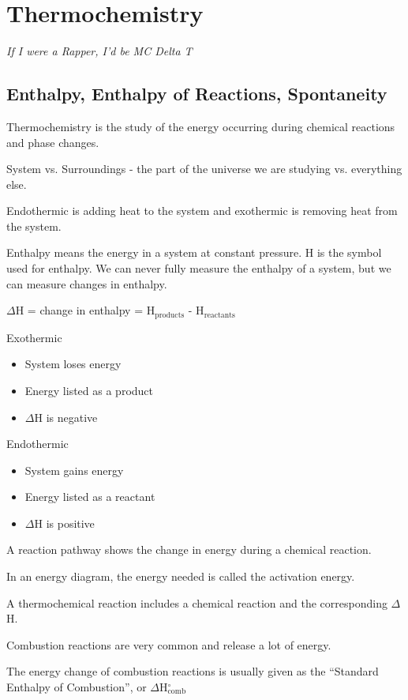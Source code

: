 \documentclass[../hchem.tex]{subfiles}
\begin{document}
\chapter{Thermochemistry}
\textit{If I were a Rapper, I'd be MC Delta T}

\section{Enthalpy, Enthalpy of Reactions, Spontaneity}
Thermochemistry is the study of the energy occurring during chemical reactions and phase changes.

System vs. Surroundings - the part of the universe we are studying vs. everything else.

Endothermic is adding heat to the system and exothermic is removing heat from the system.

Enthalpy means the energy in a system at constant pressure. H is the symbol used for enthalpy. We can never fully measure the enthalpy of a system,
but we can measure changes in enthalpy.
\begin{center}
    $\Delta$H = change in enthalpy = H$_{\text{products}}$ - H$_{\text{reactants}}$
\end{center}

Exothermic  
\begin{itemize}
    \item System loses energy 
    \item Energy listed as a product 
    \item $\Delta$H is negative 
\end{itemize}

Endothermic
\begin{itemize}
    \item System gains energy 
    \item Energy listed as a reactant 
    \item $\Delta$H is positive 
\end{itemize}

A reaction pathway shows the change in energy during a chemical reaction.

In an energy diagram, the energy needed is called the activation energy.

A thermochemical reaction includes a chemical reaction and the corresponding $\Delta$H.

Combustion reactions are very common and release a lot of energy.

The energy change of combustion reactions is usually given as the ``Standard Enthalpy of Combustion'', or $\Delta$H$^{\circ}_{\text{comb}}$
\end{document}
